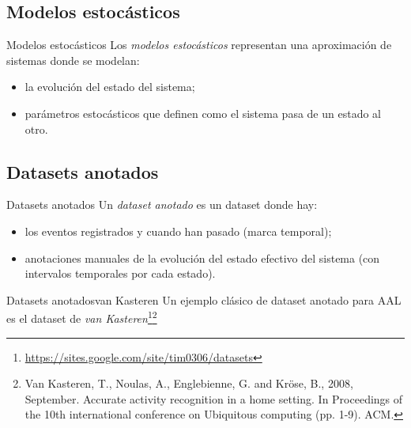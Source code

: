 \documentclass[9pt, handout]{beamer}
\begin{document}
    \subsection{Modelos estocásticos}
      \begin{frame}{Modelos estocásticos}
        \pause
        Los \textit{modelos estocásticos} representan una aproximación de sistemas donde se modelan:
        \pause
        \begin{itemize}
          \item la evolución del estado del sistema;
          \pause
          \item parámetros estocásticos que definen como el sistema pasa de un estado al otro.
        \end{itemize}
        \pause
      \end{frame}
    
    \subsection{Datasets anotados}
      \begin{frame}{Datasets anotados}
        \pause
        Un \textit{dataset anotado} es un dataset donde hay:
        \pause
        \begin{itemize}
          \item los eventos registrados y cuando han pasado (marca temporal);
          \pause
          \item anotaciones manuales de la evolución del estado efectivo del sistema (con intervalos temporales por cada estado).
        \end{itemize}
        
        \pause
        \vspace{1em}
      \end{frame}
      
      \begin{frame}{Datasets anotados}{van Kasteren}
        Un ejemplo clásico de dataset anotado para AAL es el dataset de \textit{van Kasteren}\footnote{\url{https://sites.google.com/site/tim0306/datasets}}\footnote{Van Kasteren, T., Noulas, A., Englebienne, G. and Kröse, B., 2008, September. Accurate activity recognition in a home setting. In Proceedings of the 10th international conference on Ubiquitous computing (pp. 1-9). ACM.}
        
        \pause
      \end{frame}
    
\end{document}
